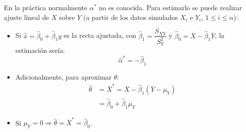 \documentclass[
]{book}
\theoremstyle{break}
\theoremstyle{nonumberplain}
\begin{document}
En la práctica normalmente \(\alpha^{\ast}\) no es conocida.
Para estimarlo se puede realizar ajuste lineal de \(X\) sobre \(Y\)
(a partir de los datos simulados \(X_{i}\) e \(Y_{i}\), \(1\leq i\leq n\)):

\begin{itemize}
\item
  Si \(\hat{x}=\hat{\beta}_{0}+\hat{\beta}_{1}y\) es la recta ajustada, con
  \(\hat{\beta}_{1} = \dfrac{S_{XY}}{S_{Y}^{2}}\) y
  \(\hat{\beta}_{0} = \overline{X}-\hat{\beta}_{1}\overline{Y}\),
  la estimación sería:
  \[\hat{\alpha}^{\ast}=-\hat{\beta}_{1}\]
\item
  Adicionalmente, para aproximar \(\theta\):
  \[\begin{aligned}
  \hat{\theta} & =\overline{X}^{\ast}=\overline{X}-\hat{\beta}_{1}\left( \overline{Y}-\mu_{Y}\right) \\  
  & =\hat{\beta}_{0}+\hat{\beta}_{1}\mu_{Y}
  \end{aligned}\]
\item
  Si \(\mu_{Y}=0\Rightarrow \hat{\theta}=\overline{X}^{\ast}=\hat{\beta}_{0}\).
\end{itemize}
\end{document}
